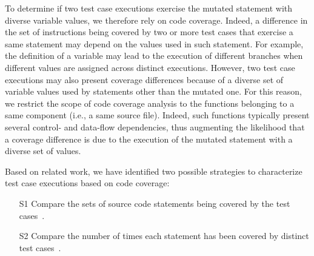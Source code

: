 To determine if two test case executions exercise the mutated statement with diverse variable values, we therefore rely on code coverage.
Indeed, a difference in the set of instructions being covered by two or more test cases that exercise a same statement may depend on the values used in such statement. For example, the definition of a variable may lead to the execution of different branches when different values are assigned across distinct executions.
However, two test case executions may also present coverage differences 
because of a diverse set of variable values used by statements other than the mutated one. 
For this reason, we restrict the scope of code coverage analysis 
to the functions belonging to a same component (i.e., a same source file).
Indeed, such functions typically present several control- and data-flow dependencies, thus 
augmenting the likelihood that a coverage difference is due to the execution of the mutated statement with a diverse set of values.


Based on related work, we have identified two possible strategies to characterize test case executions based on code coverage:
\begin{itemize}
\item[S1] Compare the sets of source code statements being covered by the test cases~\cite{grun2009impact}.
\item[S2] Compare the number of times each statement has been covered by distinct test cases~\cite{schuler2013covering}.
\end{itemize}


